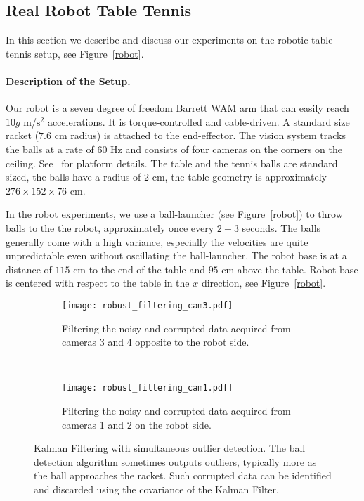 \subsection{Real Robot Table Tennis}

In this section we describe and discuss our experiments on the robotic table tennis setup, see Figure~\ref{robot}. 

\paragraph{\textbf{Description of the Setup}.} Our robot is a seven degree of freedom Barrett WAM arm that can easily reach $10g$ m/$\textrm{s}^2$ accelerations. It is torque-controlled and cable-driven. A standard size racket ($7.6$ cm radius) is attached to the end-effector. The vision system tracks the balls at a rate of $60$ Hz and consists of four cameras on the corners on the ceiling. See~\citet{Lampert12} for platform details. The table and the tennis balls are standard sized, the balls have a radius of $2$ cm, the table geometry is approximately $276 \times 152 \times 76$ cm.


In the robot experiments, we use a ball-launcher (see Figure~\ref{robot}) to throw balls to the the robot, approximately once every $2-3$ seconds. The balls generally come with a high variance, especially the velocities are quite unpredictable even without oscillating the ball-launcher. The robot base is at a distance of $115$ cm to the end of the table and $95$ cm above the table. Robot base is centered with respect to the table in the $x$ direction, see Figure~\ref{robot}. %
%
\begin{figure}
	\begin{subfigure}[t]{0.5\textwidth}
		\centering
		\texttt{[image: robust\_filtering\_cam3.pdf]}
		\caption{Filtering the noisy and corrupted data acquired from cameras 3 and 4 opposite to the robot side.}
		\label{outliersDataCam3}
	\end{subfigure}
	~ %
	\begin{subfigure}[t]{0.5\textwidth}
		\centering
		\texttt{[image: robust\_filtering\_cam1.pdf]}
		\caption{Filtering the noisy and corrupted data acquired from cameras 1 and 2 on the robot side.}
		\label{outliersDataCam1}
	\end{subfigure}
	\caption{Kalman Filtering with simultaneous outlier detection. The ball detection algorithm sometimes outputs outliers, typically more as the ball approaches the racket. Such corrupted data can be identified and discarded using the covariance of the Kalman Filter.}
	\label{outliersData}
\end{figure}
%
